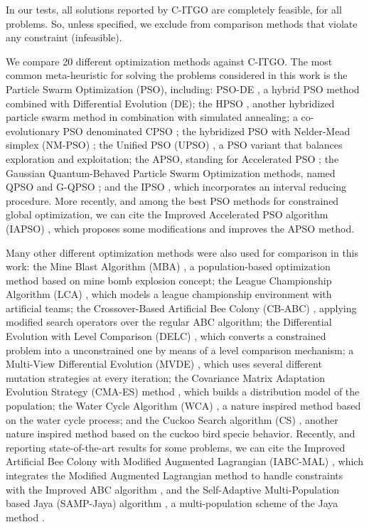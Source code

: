 


In our tests, all solutions reported by C-ITGO are completely feasible, for all problems. So, unless specified, we exclude from comparison methods that violate any constraint (infeasible).

We compare 20 different optimization methods against C-ITGO. The most common meta-heuristic for solving the problems considered in this work is the Particle Swarm Optimization (PSO), including: PSO-DE \citep{PSO-DE}, a hybrid PSO method combined with Differential Evolution (DE); the HPSO \citep{HPSO}, another hybridized particle swarm method in combination with simulated annealing; a co-evolutionary PSO denominated CPSO \citep{CPSO}; the hybridized PSO with Nelder-Mead simplex (NM-PSO) \citep{NM-PSO}; the Unified PSO (UPSO) \citep{UPSO}, a PSO variant that balances exploration and exploitation; the APSO, standing for Accelerated PSO  \citep{APSO}; the Gaussian Quantum-Behaved Particle Swarm Optimization methods, named QPSO and G-QPSO \citep{QPSO}; and the IPSO \citep{IPSO}, which incorporates an interval reducing procedure. More recently, and among the best PSO methods for constrained global optimization, we can cite the Improved Accelerated PSO algorithm (IAPSO) \citep{IAPSO}, which proposes some modifications and improves the APSO method.

Many other different optimization methods were also used for comparison in this work: the Mine Blast Algorithm (MBA) \citep{MBA}, a population-based optimization method based on mine bomb explosion concept; the League Championship Algorithm (LCA) \citep{LCA}, which models a league championship environment with artificial teams; the Crossover-Based Artificial Bee Colony (CB-ABC) \citep{CB-ABC}, applying modified search operators over the regular ABC algorithm; the Differential Evolution with Level Comparison (DELC) \citep{DELC}, which converts a constrained problem into a unconstrained one by means of a level comparison mechanism; a Multi-View Differential Evolution (MVDE) \citep{MVDE}, which uses several different mutation strategies at every iteration; the Covariance Matrix Adaptation Evolution Strategy (CMA-ES) method \citep{CMA-ES}, which builds a distribution model of the population; the Water Cycle Algorithm (WCA) \citep{WCA}, a nature inspired method based on the water cycle process; and the Cuckoo Search algorithm (CS) \citep{CS}, another nature inspired method based on the cuckoo bird specie behavior. Recently, and reporting state-of-the-art results for some problems, we can cite the Improved Artificial Bee Colony with Modified Augmented Lagrangian (IABC-MAL) \citep{IABC-Mal}, which integrates the Modified Augmented Lagrangian method to handle constraints with the Improved ABC algorithm \citep{IABC}, and the Self-Adaptive Multi-Population based Jaya (SAMP-Jaya) algorithm \citep{SAMP-Jaya}, a multi-population scheme of the Jaya method \citep{Jaya}.



